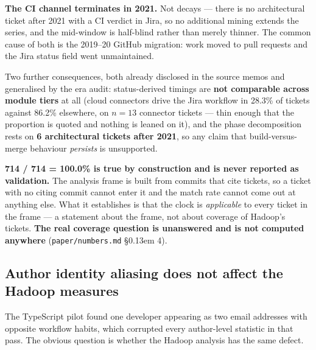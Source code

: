 \documentclass[11pt,a4paper]{article}
\begin{document}
\textbf{The CI channel terminates in 2021.} Not decays --- there is no architectural ticket after 2021 with a CI verdict in Jira, so no additional mining extends the series, and the mid-window is half-blind rather than merely thinner. The common cause of both is the 2019--20 GitHub migration: work moved to pull requests and the Jira status field went unmaintained.

Two further consequences, both already disclosed in the source memos and generalised by the era audit: status-derived timings are \textbf{not comparable across module tiers} at all (cloud connectors drive the Jira workflow in 28.3\% of tickets against 86.2\% elsewhere, on $n=13$ connector tickets --- thin enough that the proportion is quoted and nothing is leaned on it), and the phase decomposition rests on \textbf{6 architectural tickets after 2021}, so any claim that build-versus- merge behaviour \emph{persists} is unsupported.

\textbf{714 / 714 = 100.0\% is true by construction and is never reported as validation.} The analysis frame is built from commits that cite tickets, so a ticket with no citing commit cannot enter it and the match rate cannot come out at anything else. What it establishes is that the clock is \emph{applicable} to every ticket in the frame --- a statement about the frame, not about coverage of Hadoop's tickets. \textbf{The real coverage question is unanswered and is not computed anywhere} (\texttt{paper/\allowbreak{}numbers.\allowbreak{}md} \S\kern0.13em 4).

\subsection{Author identity aliasing does not affect the Hadoop measures}
\label{sec:6.3}

The TypeScript pilot found one developer appearing as two email addresses with opposite workflow habits, which corrupted every author-level statistic in that pass. The obvious question is whether the Hadoop analysis has the same defect.
\end{document}
